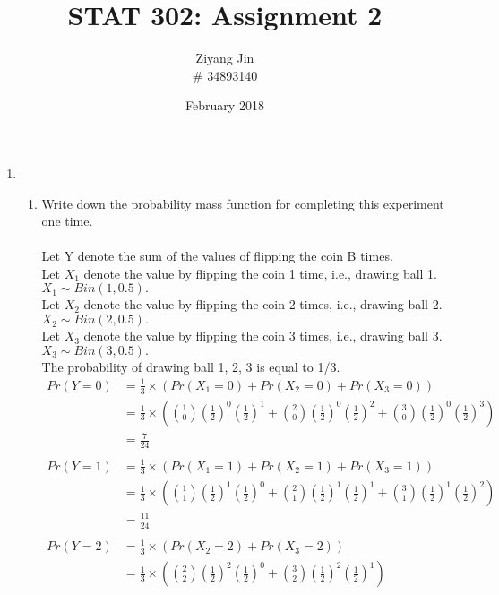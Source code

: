 \documentclass[11pt]{article}
\title{STAT 302: Assignment 2}
\author{Ziyang Jin \\
\# 34893140}
\date{February 2018}
\begin{document}
\maketitle

\begin{enumerate}[label=\textbf{Q \arabic*:},start=1]

\item 
\begin{enumerate}
\item Write down the probability mass function for completing this experiment one time.\\
\\
Let Y denote the sum of the values of flipping the coin B times.\\
Let \(X_1\) denote the value by flipping the coin 1 time, i.e., drawing ball 1. \( X_1 \sim Bin(1, 0.5).\) \\
Let \(X_2\) denote the value by flipping the coin 2 times, i.e., drawing ball 2. \( X_2 \sim Bin(2, 0.5).\) \\
Let \(X_3\) denote the value by flipping the coin 3 times, i.e., drawing ball 3. \( X_3 \sim Bin(3, 0.5).\) \\
The probability of drawing ball 1, 2, 3 is equal to 1/3.\\
\begin{equation}
\begin{split}
Pr(Y=0) & = \frac{1}{3} \times (Pr(X_1 = 0) + Pr(X_2 = 0) + Pr(X_3 = 0)) \\
& = \frac{1}{3} \times ({1 \choose 0}(\frac{1}{2})^0(\frac{1}{2})^1 + {2 \choose 0}(\frac{1}{2})^0(\frac{1}{2})^2 + {3 \choose 0}(\frac{1}{2})^0(\frac{1}{2})^3) \\
& = \frac{7}{24} \\
\\
Pr(Y=1) & = \frac{1}{3} \times (Pr(X_1 = 1) + Pr(X_2 = 1) + Pr(X_3 = 1)) \\
& = \frac{1}{3} \times ({1 \choose 1}(\frac{1}{2})^1(\frac{1}{2})^0 + {2 \choose 1}(\frac{1}{2})^1(\frac{1}{2})^1 + {3 \choose 1}(\frac{1}{2})^1(\frac{1}{2})^2) \\
& = \frac{11}{24} \\
\\
Pr(Y=2) & = \frac{1}{3} \times (Pr(X_2 = 2) + Pr(X_3 = 2)) \\
& = \frac{1}{3} \times ({2 \choose 2}(\frac{1}{2})^2(\frac{1}{2})^0 + {3 \choose 2}(\frac{1}{2})^2(\frac{1}{2})^1) \\

\end{split}
\end{equation}
\end{enumerate}
\end{enumerate}
\end{document}

